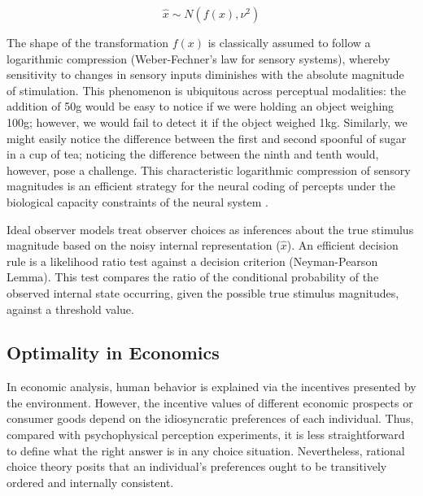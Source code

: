 \documentclass[a4paper, nobind]{templates/ociamthesis}
\begin{document}
\begin{equation}
\hat{x} \sim N(f(x),\nu^2) 
\end{equation}

The shape of the transformation \(f(x)\) is classically assumed to follow a logarithmic compression (Weber-Fechner's law for sensory systems), whereby sensitivity to changes in sensory inputs diminishes with the absolute magnitude of stimulation. This phenomenon is ubiquitous across perceptual modalities: the addition of 50g would be easy to notice if we were holding an object weighing 100g; however, we would fail to detect it if the object weighed 1kg. Similarly, we might easily notice the difference between the first and second spoonful of sugar in a cup of tea; noticing the difference between the ninth and tenth would, however, pose a challenge. This characteristic logarithmic compression of sensory magnitudes is an efficient strategy for the neural coding of percepts under the biological capacity constraints of the neural system \autocite{sun2012,wei2017}.

Ideal observer models treat observer choices as inferences about the true stimulus magnitude based on the noisy internal representation (\(\hat{x}\)). An efficient decision rule is a likelihood ratio test against a decision criterion (Neyman-Pearson Lemma). This test compares the ratio of the conditional probability of the observed internal state occurring, given the possible true stimulus magnitudes, against a threshold value.

\hypertarget{optimality-econ}{%
\subsection{Optimality in Economics}\label{optimality-econ}}

In economic analysis, human behavior is explained via the incentives presented by the environment. However, the incentive values of different economic prospects or consumer goods depend on the idiosyncratic preferences of each individual. Thus, compared with psychophysical perception experiments, it is less straightforward to define what the right answer is in any choice situation. Nevertheless, rational choice theory posits that an individual's preferences ought to be transitively ordered and internally consistent.
\end{document}
